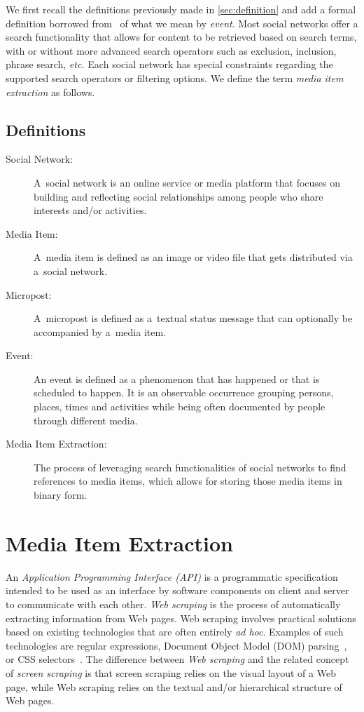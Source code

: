 We first recall the definitions previously made in
\autoref{sec:definition} and add a formal definition
borrowed from~\cite{liu2011events}
of what we mean by \emph{event}.
Most social networks offer a search functionality that allows for
content to be retrieved based on search terms,
with or without more advanced search operators
such as exclusion, inclusion, phrase search, \emph{etc.}
Each social network has special constraints
regarding the supported search operators or filtering options.
We define the term \emph{media item extraction}
as follows.

\subsection{Definitions}

\begin{description}
  \item[Social Network:]
       A~social network is an online service or media platform
       that focuses on building and reflecting
       social relationships among people
       who share interests and/or activities.
  \item[Media Item:]
       A~media item is defined as an image or video
       file that gets distributed via a~social network.
  \item[Micropost:]
       A~micropost is defined as a~textual status message
       that can optionally be accompanied by a~media item.
  \item[Event:]
       An event is defined as a phenomenon that has happened
       or that is scheduled to happen.
       It is an observable occurrence grouping persons,
       places, times and activities while being often
       documented by people through different media.
  \item[Media Item Extraction:]
       The process of leveraging search functionalities of
       social networks to find references to media items,
       which allows for storing those media items in binary form.       
\end{description}

\section{Media Item Extraction}

An \emph{Application Programming Interface (API)}
is a programmatic specification intended to be used
as an interface by software components on client and server
to communicate with each other.
\emph{Web scraping} is the process of
automatically extracting information from Web pages.
Web scraping involves practical solutions based on
existing technologies that are often entirely \emph{ad hoc}.
Examples of such technologies are regular expressions,
Document Object Model (DOM)
parsing~\cite{lehors2004dom},
or CSS selectors~\cite{hunt2012cssselectors}.
The difference between \emph{Web scraping}
and the related concept of \emph{screen scraping}
is that screen scraping relies on the visual layout of a Web page,
while Web scraping relies on the textual
and/or hierarchical structure of Web pages.

